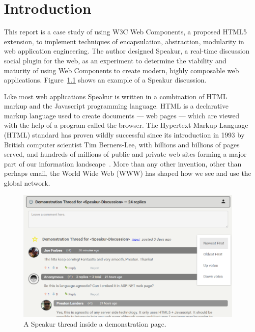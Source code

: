 \chapter{Introduction}
%

%
%

This report is a case study of using W3C Web Components, 
a proposed HTML5 extension,
to implement techniques of encapsulation, abstraction, modularity in web application engineering.
The author designed Speakur, a real-time discussion social plugin for the web, 
as an experiment to determine the viability and maturity of using Web Components to create modern, highly composable web applications. Figure~\ref{f:demo1} shows an example of a Speakur discussion.

Like most web applications Speakur is written in a combination of HTML markup and the Java\-script programming language. 
HTML is a declarative markup language used to create documents --- web pages --- which are viewed with the help of a program called the browser. 
The Hyper\-text Markup Language (HTML) 
standard has proven wildly successful since its introduction in 1993 by British computer scientist 
Tim Berners-Lee, 
with billions and billions of pages served, 
and hundreds of millions of public and private web sites forming a major part of our information landscape~\cite{internetlivestats.com2015}.
More than any other invention, other than perhaps email, the World Wide Web (WWW) has shaped how we see and use the global network.

% 
\begin{figure}[htb]
\centering
 \includegraphics[width=6in]{images/screenshot_20150312_1630_v2.png}
\caption{A Speakur thread inside a demonstration page.}
\label{f:demo1}
\end{figure}
%

